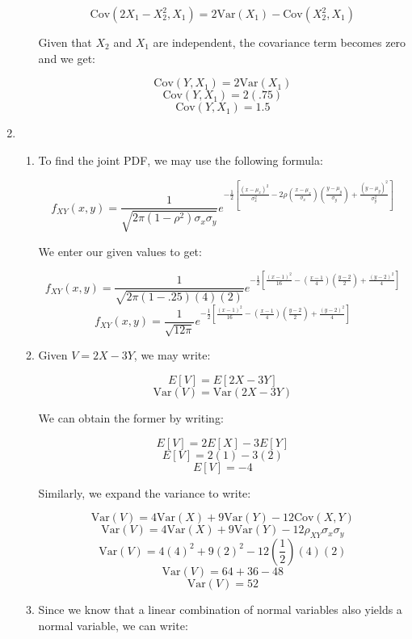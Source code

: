 \begin{enumerate}
\begin{enumerate}
        $$\text{Cov}(2X_1-X_2^2,X_1)=2\text{Var}(X_1)-\text{Cov}(X_2^2,X_1)$$

        Given that $X_2$ and $X_1$ are independent, the covariance term becomes zero and we get:

        $$\text{Cov}(Y,X_1)=2\text{Var}(X_1)$$
        $$\text{Cov}(Y,X_1)=2(.75)$$
        $$\boxed{\text{Cov}(Y,X_1)=1.5}$$

    \end{enumerate}

  \item

    \begin{enumerate}

      \item To find the joint PDF, we may use the following formula:

        $$f_{XY}(x,y)=\frac{1}{\sqrt{2\pi(1-\rho^2)\sigma_x\sigma_y}}e^{-\frac{1}{2}\left[ \frac{(x-\mu_x)^2}{\sigma_x^2}-2\rho\left( \frac{x-\mu_x}{\sigma_x} \right)\left( \frac{y-\mu_y}{\sigma_y} \right)+\frac{(y-\mu_y)^2}{\sigma_y^2}  \right]}$$

        We enter our given values to get:

        $$f_{XY}(x,y)=\frac{1}{\sqrt{2\pi(1-.25)(4)(2)}}e^{-\frac{1}{2}\left[ \frac{(x-1)^2}{16}-\left( \frac{x-1}{4} \right)\left( \frac{y-2}{2} \right)+\frac{(y-2)^2}{4}  \right]}$$
        $$\boxed{f_{XY}(x,y)=\frac{1}{\sqrt{12\pi}}e^{-\frac{1}{2}\left[ \frac{(x-1)^2}{16}-\left( \frac{x-1}{4} \right)\left( \frac{y-2}{2} \right)+\frac{(y-2)^2}{4}  \right]}}$$

      \item Given $V=2X-3Y$, we may write:

        $$E[V]=E[2X-3Y]$$
        $$\text{Var}(V)=\text{Var}(2X-3Y)$$

        We can obtain the former by writing:

        $$E[V]=2E[X]-3E[Y]$$
        $$E[V]=2(1)-3(2)$$
        $$\boxed{E[V]=-4}$$

        Similarly, we expand the variance to write:

        $$\text{Var}(V)=4\text{Var}(X)+9\text{Var}(Y)-12\text{Cov}(X,Y)$$
        $$\text{Var}(V)=4\text{Var}(X)+9\text{Var}(Y)-12\rho_{XY}\sigma_x\sigma_y$$
        $$\text{Var}(V)=4(4)^2+9(2)^2-12\left( \frac{1}{2} \right)\left( 4 \right)\left( 2 \right)$$
        $$\text{Var}(V)=64+36-48$$
        $$\boxed{\text{Var}(V)=52}$$

      \item Since we know that a linear combination of normal variables also yields a normal variable, we can write:


\end{enumerate}
\end{enumerate}
